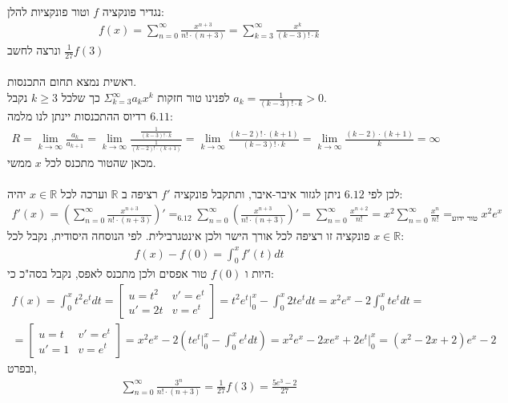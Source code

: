 \documentclass{article}
\DeclareMathOperator*{\equals}{=}
\def\reals{\mathbb{R}}
\begin{document}
נגדיר פונקציה $f$ וטור פונקציות להלן:
\begin{align*}
    f(x)=\sum_{n=0}^\infty \frac{x^{n+3}}{n! \cdot (n+3)}
    =\sum_{k=3}^\infty \frac{x^{k}}{(k-3)! \cdot k}
\end{align*}
ונרצה לחשב $\frac{1}{27}f(3)$\\\\
ראשית נמצא תחום התכנסות. \\
לפנינו טור חזקות $\Sigma_{k=3}^\infty a_kx^k$ כך שלכל $k\geq 3$ נקבל $a_k=\frac{1}{(k-3)! \cdot k}>0$.\\
רדיוס ההתכנסות יינתן לנו מלמה $6.11$:
\begin{align*}
    R=
    \lim_{k\rightarrow\infty} \frac{a_k}{a_{k+1}}=
    \lim_{k\rightarrow\infty} \frac{\frac{1}{(k-3)! \cdot k}}{\frac{1}{(k-2)! \cdot (k+1)}}=
    \lim_{k\rightarrow\infty} \frac{(k-2)! \cdot (k+1)}{(k-3)! \cdot k}=
    \lim_{k\rightarrow\infty} \frac{(k-2) \cdot (k+1)}{k}=
    \infty
\end{align*}
מכאן שהטור מתכנס לכל $x$ ממשי.\\\\
לכן לפי $6.12$ ניתן לגזור איבר-איבר, ותתקבל פונקציה $f'$ רציפה ב $\reals$ וערכה לכל $x\in \reals$ יהיה:
\begin{align*}
    f'(x)=(\sum_{n=0}^\infty \frac{x^{n+3}}{n! \cdot (n+3)})'\equals_{6.12}
    \sum_{n=0}^\infty (\frac{x^{n+3}}{n! \cdot (n+3)})'=
    \sum_{n=0}^\infty \frac{x^{n+2}}{n!}=
    x^2\sum_{n=0}^\infty \frac{x^{n}}{n!}\equals_{\text{טור ידוע}}
    x^2e^x
\end{align*}
פונקציה זו רציפה לכל אורך הישר ולכן אינטגרבילית. לפי הנוסחה היסודית, נקבל לכל $x\in \reals$:
\begin{align*}
    f(x)-f(0)=\int_0^x f'(t)dt
\end{align*}
היות ו $f(0)$ טור אפסים ולכן מתכנס לאפס, נקבל בסה"כ כי:
\begin{align*}
    f(x)=
    \int_0^x t^2e^tdt =
    \begin{bmatrix}
        u=t^2 & v'=e^t \\
        u'=2t & v=e^t
    \end{bmatrix}=
    t^2e^t\bigg|_0^x-\int_0^x 2t e^tdt =
    x^2e^x - 2\int_0^x t e^tdt = \\
    =\begin{bmatrix}
        u=t  & v'=e^t \\
        u'=1 & v=e^t
    \end{bmatrix}=
    x^2e^x - 2(te^t\bigg|_0^x-\int_0^x e^tdt)=
    x^2e^x - 2xe^x+2e^t\bigg|_0^x=
    (x^2-2x+2)e^x-2
\end{align*}
ובפרט,
\begin{align*}
    \sum_{n=0}^\infty \frac{3^n}{n!\cdot (n+3)} = \frac{1}{27}f(3) = \frac{5e^3-2}{27}
\end{align*}
\end{document}
